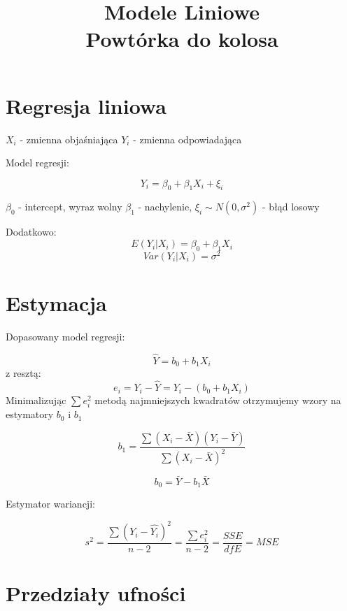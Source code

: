 \documentclass[9pt]{article}  %
\begin{document}
\title{Modele Liniowe \\ Powtórka do kolosa}       
\maketitle                     %



\section{Regresja liniowa}

  $X_i$ - zmienna objaśniająca \newline
  $Y_i$ - zmienna odpowiadająca \newline
  
  Model regresji:
  
  $$Y_i = \beta_0 + \beta_1 X_i + \xi_i$$
  
  $\beta_0$ - intercept, wyraz wolny $\beta_1$ - nachylenie, $\xi_i \sim N \left(0, \sigma^2 \right)$ - błąd losowy

  Dodatkowo: \newline
  $$E(Y_i | X_i) = \beta_0 + \beta_1 X_i$$
  $$Var(Y_i | X_i) = \sigma^2$$
  
  
\section{Estymacja}

  Dopasowany model regresji:

  $$\hat{Y} = b_0 + b_1 X_i$$
  z resztą: 
  $$e_i = Y_i - \hat{Y} = Y_i - (b_0 + b_1 X_i)$$
  Minimalizując $\sum {e^2_{i} }$ metodą najmniejszych kwadratów otrzymujemy wzory na estymatory $b_0$ i $b_1$
  
    $$
  b_1 = \frac{\sum{\left(X_i - \bar{X} \right) \left( Y_i - \bar{Y} \right) } }{\sum{\left(X_i - \bar{X} \right) ^2 } }
  $$

  $$
  b_0 = \bar{Y} - b_1 \bar{X}
  $$
  
  Estymator wariancji:
  
    $$ s^2 = \frac{ \sum{ \left( Y_i - \hat{Y_i} \right)^2 } } { n-2 }  = \frac{ \sum{e^2_i}  }{n-2} = \frac{SSE}{dfE} = MSE$$
  
  
  
  \section{Przedziały ufności}
  
\end{document}
